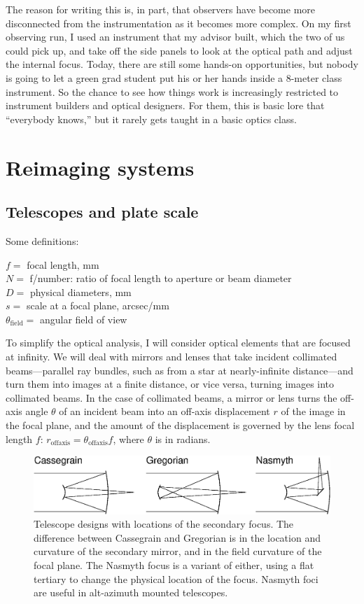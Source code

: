 \documentclass[12pt]{article}
\begin{document}
The reason for writing this is, in part, that observers have become
more disconnected from the instrumentation as it becomes more complex.
On my first observing run, I used an instrument that
my advisor built, which the two of us could pick up, and
take off the side panels to look at the optical path and adjust
the internal focus.  Today, there are still some hands-on
opportunities, but nobody is going to let a green 
grad student put his or her hands inside a 8-meter class instrument.
So the chance to see how things work is increasingly 
restricted to instrument builders and optical designers.  
For them, this is basic lore
that ``everybody knows,'' but it rarely gets taught in a
basic optics class.


\section{Reimaging systems}

\subsection{Telescopes and plate scale}

Some definitions:

\noindent
$f =$ focal length, mm \\
$N =$ f/number: ratio of focal length to aperture or beam diameter \\
$D =$ physical diameters, mm \\
$s =$ scale at a focal plane, arcsec/mm \\
$\theta_{\mathrm{field}} =$ angular field of view 

To simplify the optical analysis, I will consider optical
elements that are focused at infinity.
We will deal with mirrors and lenses that take
incident collimated beams---parallel ray bundles, such as from a
star at nearly-infinite distance---and turn them into images
at a finite distance, or vice versa, turning images into collimated 
beams.  In the case of collimated beams, a mirror or lens turns the off-axis
angle $\theta$ of an incident beam into an off-axis displacement $r$
of the image in the focal plane,
and the amount of the displacement is governed by the 
lens focal length $f$: $r_{\mathrm{offaxis}} = \theta_{\mathrm{offaxis}} f$, where
$\theta$ is in radians.

\begin{figure}[ht]
\centerline{
\includegraphics[width=5.5truein]{teltypes.eps}
}
\caption{Telescope designs with locations of the secondary focus.  
The difference between Cassegrain and Gregorian is in the
location and curvature of the secondary mirror, and in the
field curvature of the focal plane.  The Nasmyth focus is a
variant of either, using a flat tertiary to change the physical
location of the focus.  Nasmyth foci are useful in alt-azimuth
mounted telescopes.
}
\label{fig-teltypes}
\end{figure}
\end{document}
